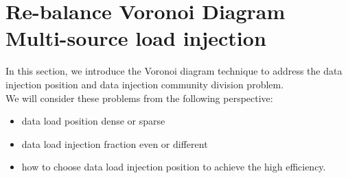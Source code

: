\section{Re-balance Voronoi Diagram Multi-source load injection}

In this section, we introduce the Voronoi diagram technique to address the data injection position and data injection community division problem. 
\\
We will consider these problems from the following perspective:

\begin{itemize}
\item data load position dense or sparse
\item data load injection fraction even or different
\item how to choose data load injection position to achieve the high efficiency.
\end{itemize}






